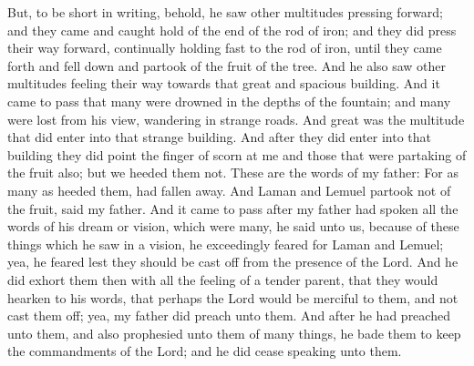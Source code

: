 But, to be short in writing, behold, he saw other multitudes pressing forward; and they came and caught hold of the end of the rod of iron; and they did press their way forward, continually holding fast to the rod of iron, until they came forth and fell down and partook of the fruit of the tree.
\bverse \iffalse And he also saw other multitudes feeling their way towards that great and spacious building. \fi
And he also saw other multitudes feeling their way towards that great and spacious building.
\bverse \iffalse And it came to pass that many were drowned in the depths of the fountain; and many were lost from his view, wandering in strange roads. \fi
And it came to pass that many were drowned in the depths of the fountain; and many were lost from his view, wandering in strange roads.
\bverse \iffalse And great was the multitude that did enter into that strange building. And after they did enter into that building they did point the finger of scorn at me and those that were partaking of the fruit also; but we heeded them not. \fi
And great was the multitude that did enter into that strange building. And after they did enter into that building they did point the finger of scorn at me and those that were partaking of the fruit also; but we heeded them not.
\bverse \iffalse These are the words of my father: For as many as heeded them, had fallen away. \fi
These are the words of my father: For as many as heeded them, had fallen away.
\bverse \iffalse And Laman and Lemuel partook not of the fruit, said my father. \fi
And Laman and Lemuel partook not of the fruit, said my father.
\bverse \iffalse And it came to pass after my father had spoken all the words of his dream or vision, which were many, he said unto us, because of these things which he saw in a vision, he exceedingly feared for Laman and Lemuel; yea, he feared lest they should be cast off from the presence of the Lord. \fi
And it came to pass after my father had spoken all the words of his dream or vision, which were many, he said unto us, because of these things which he saw in a vision, he exceedingly feared for Laman and Lemuel; yea, he feared lest they should be cast off from the presence of the Lord.
\bverse \iffalse And he did exhort them then with all the feeling of a tender parent, that they would hearken to his words, that perhaps the Lord would be merciful to them, and not cast them off; yea, my father did preach unto them. \fi
And he did exhort them then with all the feeling of a tender parent, that they would hearken to his words, that perhaps the Lord would be merciful to them, and not cast them off; yea, my father did preach unto them.
\bverse \iffalse And after he had preached unto them, and also prophesied unto them of many things, he bade them to keep the commandments of the Lord; and he did cease speaking unto them. \fi
And after he had preached unto them, and also prophesied unto them of many things, he bade them to keep the commandments of the Lord; and he did cease speaking unto them.

